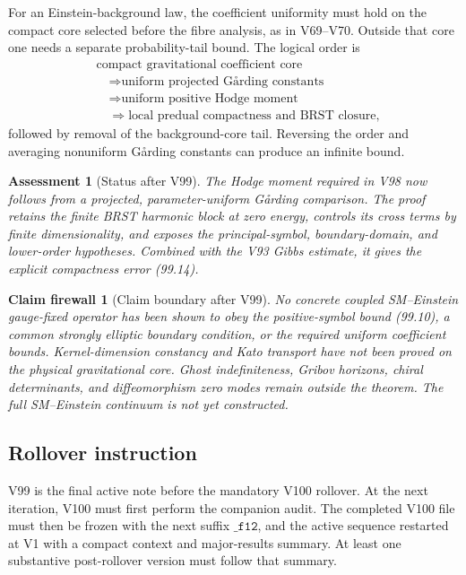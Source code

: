 \documentclass[11pt]{article}
\newtheorem{firewall}[theorem]{Claim firewall}
\newtheorem{assessment}[theorem]{Assessment}
\theoremstyle{remark}
\begin{document}
For an Einstein-background law, the coefficient uniformity must hold
on the compact core selected before the fibre analysis, as in
V69--V70.  Outside that core one needs a separate probability-tail
bound.  The logical order is
\[
 \begin{split}
 &\text{compact gravitational coefficient core}\\
 &\quad\Longrightarrow
 \text{uniform projected G{\aa}rding constants}\\
 &\quad\Longrightarrow
 \text{uniform positive Hodge moment}\\
 &\quad\Longrightarrow
 \text{local predual compactness and BRST closure},
 \end{split}                                                     \tag{99.16}
\]
followed by removal of the background-core tail.  Reversing the
order and averaging nonuniform G{\aa}rding constants can produce an
infinite bound.

\begin{assessment}[Status after V99]
\label{ass:v12v99-status}
The Hodge moment required in V98 now follows from a projected,
parameter-uniform G{\aa}rding comparison.  The proof retains the
finite BRST harmonic block at zero energy, controls its cross terms
by finite dimensionality, and exposes the principal-symbol,
boundary-domain, and lower-order hypotheses.  Combined with the V93
Gibbs estimate, it gives the explicit compactness error (99.14).
\end{assessment}

\begin{firewall}[Claim boundary after V99]
\label{fire:v12v99-claim}
No concrete coupled SM--Einstein gauge-fixed operator has been shown
to obey the positive-symbol bound (99.10), a common strongly
elliptic boundary condition, or the required uniform coefficient
bounds.  Kernel-dimension constancy and Kato transport have not been
proved on the physical gravitational core.  Ghost indefiniteness,
Gribov horizons, chiral determinants, and diffeomorphism zero modes
remain outside the theorem.  The full SM--Einstein continuum is not
yet constructed.
\end{firewall}

\subsection{Rollover instruction}

V99 is the final active note before the mandatory V100 rollover.
At the next iteration, V100 must first perform the companion audit.
The completed V100 file must then be frozen with the next suffix
\(\texttt{\_f12}\), and the active sequence restarted at V1 with a
compact context and major-results summary.  At least one substantive
post-rollover version must follow that summary.
\end{document}
